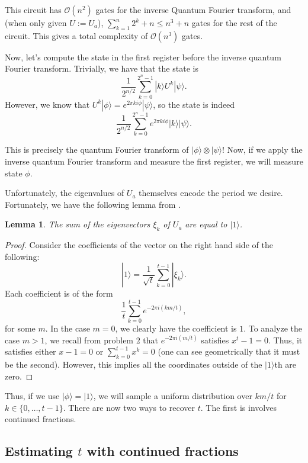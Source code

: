\documentclass{amsart}
\newtheorem{lemma}[theorem]{Lemma}
\theoremstyle{definition}
\theoremstyle{remark}
\newcommand{\ket}[1] {|#1\rangle}
\begin{document}
This circuit has $\mathcal{O}(n^2)$ gates for the inverse Quantum Fourier
transform, and (when only given $U := U_a$), $\sum_{k=1}^n 2^k + n \leq n^3 + n$
gates for the rest of the circuit. This gives a total complexity of
$\mathcal{O}(n^3)$ gates.

Now, let's compute the state in the first register before the inverse quantum
Fourier transform. Trivially, we have that the state is
\[
    \frac{1}{2^{n/2}} \sum_{k = 0}^{2^n - 1} \ket{k} U^k \ket{\psi}.
\]
However, we know that $U^k \ket{\phi} = e^{2 \pi k i \phi} \ket{\psi}$, so the
state is indeed
\[
    \frac{1}{2^{n/2}} \sum_{k = 0}^{2^n - 1} e^{2 \pi k i \phi} \ket{k}
        \ket{\psi}.
\]

This is precisely the quantum Fourier transform of $\ket{\phi} \otimes
\ket{\psi}$!  Now, if we apply the inverse quantum Fourier transform and measure
the first register, we will measure state $\phi$.

Unfortunately, the eigenvalues of $U_a$ themselves encode the period we desire.
Fortunately, we have the following lemma from \cite{hw012}.

\begin{lemma}
    The sum of the eigenvectors $\xi_k$ of $U_a$ are equal to $\ket{1}$.
\end{lemma}

\begin{proof}
    Consider the coefficients of the vector on the right hand side of the
    following:
    \[
        \ket{1} = \frac{1}{\sqrt{t}} \sum_{k=0}^{t-1} \ket{\xi_k}.
    \]
    Each coefficient is of the form
    \[
        \frac{1}{t} \sum_{k=0}^{t-1} e^{-2\pi i (km /t)},
    \]
    for some $m$. In the case $m = 0$, we clearly have the coefficient is $1$.
    To analyze the case $m > 1$, we recall from problem $2$ that $e^{-2\pi i
        (m/t)}$ satisfies $x^t - 1 = 0$. Thus, it satisfies either $x-1=0$
    or $\sum_{k=0}^{t-1} x^k = 0$ (one can see geometrically that it must be the
    second). However, this implies all the coordinates outside of the
    $\ket{1}$th are zero.
\end{proof}

Thus, if we use $\ket{\phi} = \ket{1}$, we will sample a uniform distribution
over $km/t$ for $k \in \{0, \dots, t-1\}$. There are now two ways to recover
$t$. The first is involves continued fractions.

\subsection{Estimating $t$ with continued fractions}
\end{document}
